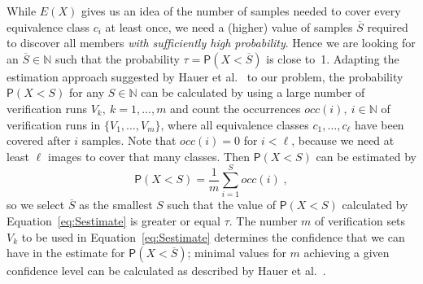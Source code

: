 \documentclass[runningheads,a4paper]{llncs}
\begin{document}
While $E(X)$ gives us an idea of   the number of samples needed to cover every equivalence class $c_i$ at least once,  we need a (higher) value of samples $\overline S$ required to discover all members {\it with sufficiently high probability}. Hence we are looking for an   $\overline S\in \mathbb{N}$ such that the
probability    $\tau = \mathsf{P}(X < \overline S)$ is close to~1. Adapting the estimation approach suggested  by Hauer  et al.~\cite{DBLP:conf/itsc/HauerSHP19} to our problem,  the probability $\mathsf{P}(X < S)$ for any   $S\in \mathbb{N}$ can be calculated by using a large number of verification runs $V_k,\ k = 1,\dots,m$  and count the occurrences   $occ(i),\ i \in \mathbb{N}$ of verification runs in 
$\{V_1,\dots,V_m\}$, where all equivalence classes
$c_1,\dots,c_\ell$ have been covered after $i$ samples. Note that $occ(i) = 0$ for $i < \ell$, because we need at least $\ell$ images to cover that many classes. 
Then   $\mathsf{P}(X < S)$ can be estimated by
\begin{equation}\label{eq:Sestimate}
   \mathsf{P}(X < S) = \frac{1}{m}\sum_{i=1}^S occ(i)\;,
\end{equation}
so we select $\overline S$ as the smallest $S$ such that the value of $\mathsf{P}(X < S)$ calculated by Equation~\eqref{eq:Sestimate} is greater or equal $\tau$. The number $m$  of verification sets $V_k$ to be used in Equation~\eqref{eq:Sestimate} determines the confidence that we can have in the estimate for $\mathsf{P}(X < \overline S)$; minimal values  for $m$ achieving a given confidence level can be calculated as described by Hauer  et al.~\cite{DBLP:conf/itsc/HauerSHP19}. 

 
 
\end{document}
